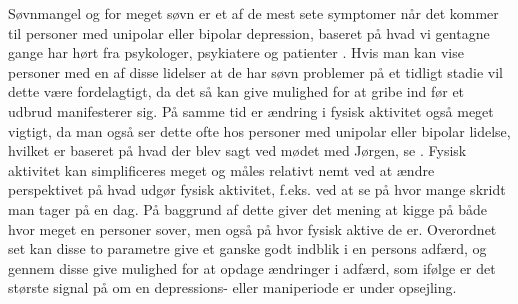 Søvnmangel og for meget søvn er et af de mest sete symptomer når det kommer til personer med unipolar eller bipolar depression, baseret på hvad vi gentagne gange har hørt fra psykologer, psykiatere og patienter \citep{misc:jorgen-aagaard, misc:janne-rasmussen, misc:faellesrapp}.
Hvis man kan vise personer med en af disse lidelser at de har søvn problemer på et tidligt stadie vil dette være fordelagtigt, da det så kan give mulighed for at gribe ind før et udbrud manifesterer sig.
På samme tid er ændring i fysisk aktivitet også meget vigtigt, da man også ser dette ofte hos personer med unipolar eller bipolar lidelse, hvilket er baseret på hvad der blev sagt ved mødet med Jørgen, se \citep[Kapitel 1, Sektion 4]{misc:faellesrapp}. 
Fysisk aktivitet kan simplificeres meget og måles relativt nemt ved at ændre perspektivet på hvad udgør fysisk aktivitet, f.eks. ved at se på hvor mange skridt man tager på en dag.
På baggrund af dette giver det mening at kigge på både hvor meget en personer sover, men også på hvor fysisk aktive de er.
Overordnet set kan disse to parametre give et ganske godt indblik i en persons adfærd, og gennem disse give mulighed for at opdage ændringer i adfærd, som ifølge \citet{misc:jorgen-aagaard} er det største signal på om en depressions- eller maniperiode er under opsejling. 